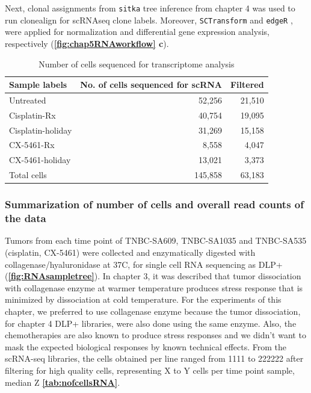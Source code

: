 Next, clonal assignments from \texttt{sitka} tree inference from chapter 4 was used to run clonealign \cite{campbell2019clonealign} for \ac{scRNAseq} clone labels. Moreover, \texttt{SCTransform} \cite{hafemeister2019normalization}and \texttt{edgeR} \cite{robinson2010edger}, were applied for normalization and differential gene expression analysis, respectively (\textbf{\autoref{fig:chap5RNAworkflow} c}). 


\begin{table}[htbp]
 \centering
  \caption{Number of cells sequenced for transcriptome analysis}
{
\begin{tabular}{|l|r|r|}
\hline
Sample labels     & No. of cells sequenced for scRNA & Filtered \\
\hline
Untreated         & 52,256                           & 21,510    \\
Cisplatin-Rx      & 40,754                           & 19,095    \\
Cisplatin-holiday & 31,269                           & 15,158    \\
CX-5461-Rx        & 8,558                            & 4,047     \\
CX-5461-holiday   & 13,021                           & 3,373  \\  
\hline
Total cells          & 145,858                          & 63,183\\
\hline
\end{tabular}%
\label{tab:nofcellsRNA}
}
\end{table}

 
\subsubsection{Summarization of number of cells and overall read counts of the data}
Tumors from each time point of TNBC-SA609, TNBC-SA1035 and TNBC-SA535 (cisplatin, CX-5461) were collected and enzymatically digested with collagenase/hyaluronidase at 37\textdegree C, for single cell RNA sequencing as DLP+ (\textbf{\autoref{fig:RNAsampletree}}). In chapter 3, it was described that tumor dissociation with collagenase enzyme at warmer temperature produces stress response that is minimized
by dissociation at cold temperature. For the experiments of this chapter, we preferred to use collagenase enzyme because the tumor dissociation, for chapter 4 DLP+ libraries, were also done using the same enzyme. Also, the chemotherapies are also known to produce stress responses and we didn't want to mask the expected biological responses by known technical effects. 
From the scRNA-seq libraries, the cells obtained per line ranged from 1111 to 222222 after filtering for high quality cells, representing X to Y cells per time point sample, median Z \textbf{\autoref{tab:nofcellsRNA}}. 

